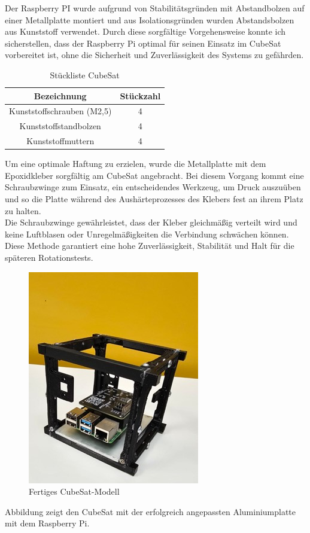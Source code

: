 Der Raspberry PI wurde aufgrund von Stabilitätsgründen mit Abstandbolzen auf einer Metallplatte montiert und aus Isolationsgründen wurden Abstandsbolzen aus Kunststoff verwendet. Durch diese sorgfältige Vorgehensweise konnte ich sicherstellen, dass der Raspberry Pi optimal für seinen Einsatz im CubeSat vorbereitet ist, ohne die Sicherheit und Zuverlässigkeit des Systems zu gefährden.\\
\vspace{3mm}
\begin{table}[H]
    \centering
    \begin{tabular}{ | c | c | } 
  \hline
   \textbf{Bezeichnung} & \textbf{Stückzahl}\\ 
  \hline
   Kunststoffschrauben (M2,5) & 4\\ 
  \hline
  Kunststoffstandbolzen & 4 \\ 
  \hline
  Kunststoffmuttern & 4\\
  \hline
\end{tabular}
    \caption{Stückliste CubeSat}
\end{table}
Um eine optimale Haftung zu erzielen, wurde die Metallplatte mit dem Epoxidkleber sorgfältig am CubeSat angebracht. Bei diesem Vorgang kommt eine Schraubzwinge zum Einsatz, ein entscheidendes Werkzeug, um Druck auszuüben und so die Platte während des Aushärteprozesses des Klebers fest an ihrem Platz zu halten.\\
\vspace{3mm}
Die Schraubzwinge gewährleistet, dass der Kleber gleichmäßig verteilt wird und keine Luftblasen oder Unregelmäßigkeiten die Verbindung schwächen können. Diese Methode garantiert eine hohe Zuverlässigkeit, Stabilität und Halt für die späteren Rotationstests.\\
\vspace{3mm}
\begin{figure}[H]
    \centering
    \includegraphics[scale = 0.7]{image/fertigercube.jpg}
    \caption{Fertiges CubeSat-Modell}
    \label{fig:enter-label}
\end{figure}
Abbildung zeigt den CubeSat mit der erfolgreich angepassten Aluminiumplatte mit dem Raspberry Pi.\\
